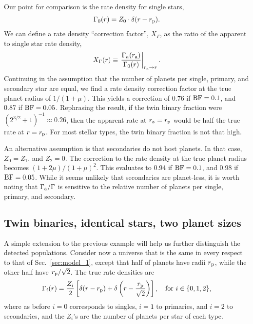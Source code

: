 \documentclass[12pt,modern]{aastex61}
\renewcommand{\a}{_{\rm a}}
\newcommand{\p}{_{\rm p}}
\begin{document}
Our point for comparison is the rate density for single stars,
\begin{equation}
\Gamma_0(r) = Z_0 \cdot \delta(r-r\p).
\end{equation}
We can define a rate density ``correction factor'', $X_\Gamma$, as the ratio 
of the apparent to single star rate density,
\begin{equation}
X_\Gamma(r) \equiv \left. \frac{\Gamma_a(r\a)}{\Gamma_0(r)} \right|_{r\a 
    \rightarrow r}.
\end{equation}
Continuing in the assumption that the number of planets per single, primary, 
and secondary star are equal, we find a rate density 
correction factor at the true planet radius of $1/(1+\mu)$.
This yields a correction of 0.76 if ${\rm BF}=0.1$, and 0.87 if ${\rm 
    BF}=0.05$. Rephrasing the result, if the twin binary fraction were 
$(2^{3/2}+1)^{-1}\approx 0.26$, then the apparent rate at $r\a=r\p$ would be 
half the true rate at $r=r\p$.
For most stellar types, the twin binary fraction is not that high.

An alternative assumption is that secondaries do not host planets. In that 
case, $Z_0=Z_1$, and $Z_2=0$. The correction to the rate density at the true 
planet radius becomes $(1+2\mu)/(1+\mu)^2$.
This evaluates to 0.94 if ${\rm BF}=0.1$, and 0.98 if ${\rm BF}=0.05$.
While it seems unlikely that secondaries are planet-less, 
it is worth noting that $\Gamma\a/\Gamma$ is sensitive to the relative number 
of planets per single, primary, and secondary.

\subsection{Twin binaries, identical stars, two planet sizes}

A simple extension to the previous example will help us further distinguish 
the detected populations.
Consider now a universe that is the same in every respect to that of 
Sec.~\ref{sec:model_1}, except that half of planets have radii $r\p$, while 
the other half have $r\p/\sqrt{2}$.
The true rate densities are
\begin{equation}
\Gamma_i(r) = \frac{Z_i}{2} \left[
\delta(r-r\p) + \delta\left(r-\frac{r\p}{\sqrt{2}}\right)
\right], \quad {\rm for}\  i \in \{ 0,1,2 \},
\end{equation}
where as before $i=0$ corresponds to singles, $i=1$ to primaries, and $i=2$ to 
secondaries, and the $Z_i$'s are the number of planets per star of each type.
\end{document}
